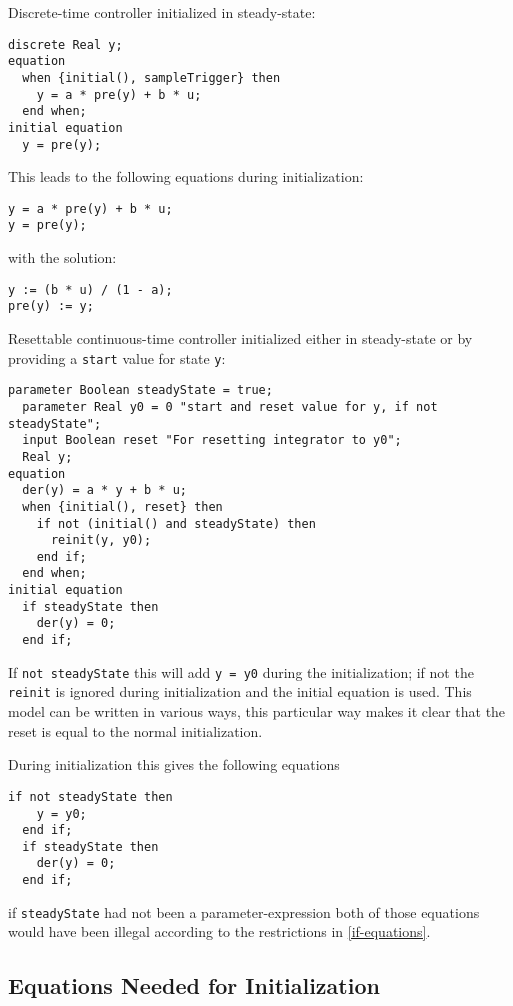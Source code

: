 \begin{example}
Discrete-time controller initialized in steady-state:
\begin{lstlisting}[language=modelica]
  discrete Real y;
equation
  when {initial(), sampleTrigger} then
    y = a * pre(y) + b * u;
  end when;
initial equation
  y = pre(y);
\end{lstlisting}

This leads to the following equations during initialization:
\begin{lstlisting}[language=modelica]
y = a * pre(y) + b * u;
y = pre(y);
\end{lstlisting}
with the solution:
\begin{lstlisting}[language=modelica]
y := (b * u) / (1 - a);
pre(y) := y;
\end{lstlisting}
\end{example}

\begin{example}
Resettable continuous-time controller initialized either in steady-state or by providing a \lstinline!start! value for state \lstinline!y!:
\begin{lstlisting}[language=modelica]
  parameter Boolean steadyState = true;
  parameter Real y0 = 0 "start and reset value for y, if not steadyState";
  input Boolean reset "For resetting integrator to y0";
  Real y;
equation
  der(y) = a * y + b * u;
  when {initial(), reset} then
    if not (initial() and steadyState) then
      reinit(y, y0);
    end if;
  end when;
initial equation
  if steadyState then
    der(y) = 0;
  end if;
\end{lstlisting}
If \lstinline!not steadyState! this will add \lstinline!y = y0! during the initialization; if not the \lstinline!reinit! is ignored during initialization and the initial equation is used.
This model can be written in various ways, this particular way makes it clear that the reset is equal to the normal initialization.

During initialization this gives the following equations
\begin{lstlisting}[language=modelica]
  if not steadyState then
    y = y0;
  end if;
  if steadyState then
    der(y) = 0;
  end if;
\end{lstlisting}
if \lstinline!steadyState! had not been a parameter-expression both of those equations would have been illegal according to the restrictions in \cref{if-equations}.
\end{example}

\subsection{Equations Needed for Initialization}\label{the-number-of-equations-needed-for-initialization}\label{equations-needed-for-initialization}

